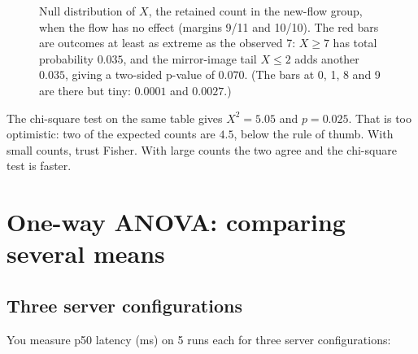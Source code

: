 \begin{figure}[H]
\centering
{}
\caption{Null distribution of $X$, the retained count in the new-flow group,
when the flow has no effect (margins 9/11 and 10/10). The red bars are outcomes
at least as extreme as the observed 7: $X \ge 7$ has total probability $0.035$,
and the mirror-image tail $X \le 2$ adds another $0.035$, giving a two-sided
p-value of $0.070$. (The bars at 0, 1, 8 and 9 are there but tiny: $0.0001$ and
$0.0027$.)}
\label{fig:cg-fisher}
\end{figure}

The chi-square test on the same table gives $X^2 = 5.05$ and $p = 0.025$. That
is too optimistic: two of the expected counts are $4.5$, below the rule of
thumb. With small counts, trust Fisher. With large counts the two agree and
the chi-square test is faster.

\section{One-way ANOVA: comparing several means}
\label{sec:cg-anova}

\subsection{Three server configurations}

You measure p50 latency (ms) on 5 runs each for three server configurations:

